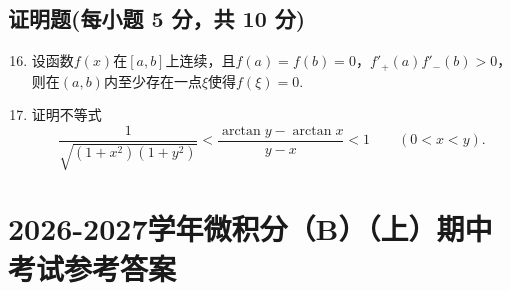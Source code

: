 \documentclass[../main.tex]{subfiles}
\begin{document}
\section{证明题(每小题 5 分，共 10 分)}
\begin{enumerate}
    \setcounter{enumi}{15}
    \item 设函数$f(x)$在$[a,b]$上连续，且$f(a)=f(b)=0$，$f'_{+}(a)f'_{-}(b)>0$，则在$(a,b)$内至少存在一点$\xi$使得$f(\xi)=0$.
          \vspace{10em}

    \item 证明不等式
          \[
              \frac{1}{\sqrt{\left(1+x^{2}\right)\left(1+y^{2}\right)}}<\frac{\arctan y-\arctan x}{y-x}<1\qquad(0<x<y).
          \]
          \vspace{10em}
\end{enumerate}

\chapter{2026-2027学年微积分（B）（上）期中考试参考答案}
\end{document}

